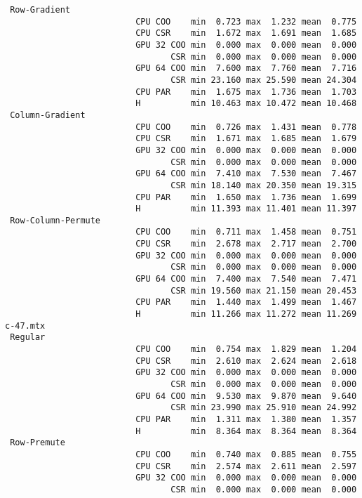 \begin{verbatim}
 Row-Gradient
                          CPU COO    min  0.723 max  1.232 mean  0.775
                          CPU CSR    min  1.672 max  1.691 mean  1.685
                          GPU 32 COO min  0.000 max  0.000 mean  0.000
                                 CSR min  0.000 max  0.000 mean  0.000
                          GPU 64 COO min  7.600 max  7.760 mean  7.716
                                 CSR min 23.160 max 25.590 mean 24.304
                          CPU PAR    min  1.675 max  1.736 mean  1.703
                          H          min 10.463 max 10.472 mean 10.468
 Column-Gradient
                          CPU COO    min  0.726 max  1.431 mean  0.778
                          CPU CSR    min  1.671 max  1.685 mean  1.679
                          GPU 32 COO min  0.000 max  0.000 mean  0.000
                                 CSR min  0.000 max  0.000 mean  0.000
                          GPU 64 COO min  7.410 max  7.530 mean  7.467
                                 CSR min 18.140 max 20.350 mean 19.315
                          CPU PAR    min  1.650 max  1.736 mean  1.699
                          H          min 11.393 max 11.401 mean 11.397
 Row-Column-Permute
                          CPU COO    min  0.711 max  1.458 mean  0.751
                          CPU CSR    min  2.678 max  2.717 mean  2.700
                          GPU 32 COO min  0.000 max  0.000 mean  0.000
                                 CSR min  0.000 max  0.000 mean  0.000
                          GPU 64 COO min  7.400 max  7.540 mean  7.471
                                 CSR min 19.560 max 21.150 mean 20.453
                          CPU PAR    min  1.440 max  1.499 mean  1.467
                          H          min 11.266 max 11.272 mean 11.269
c-47.mtx
 Regular
                          CPU COO    min  0.754 max  1.829 mean  1.204
                          CPU CSR    min  2.610 max  2.624 mean  2.618
                          GPU 32 COO min  0.000 max  0.000 mean  0.000
                                 CSR min  0.000 max  0.000 mean  0.000
                          GPU 64 COO min  9.530 max  9.870 mean  9.640
                                 CSR min 23.990 max 25.910 mean 24.992
                          CPU PAR    min  1.311 max  1.380 mean  1.357
                          H          min  8.364 max  8.364 mean  8.364
 Row-Premute
                          CPU COO    min  0.740 max  0.885 mean  0.755
                          CPU CSR    min  2.574 max  2.611 mean  2.597
                          GPU 32 COO min  0.000 max  0.000 mean  0.000
                                 CSR min  0.000 max  0.000 mean  0.000

\end{verbatim}
